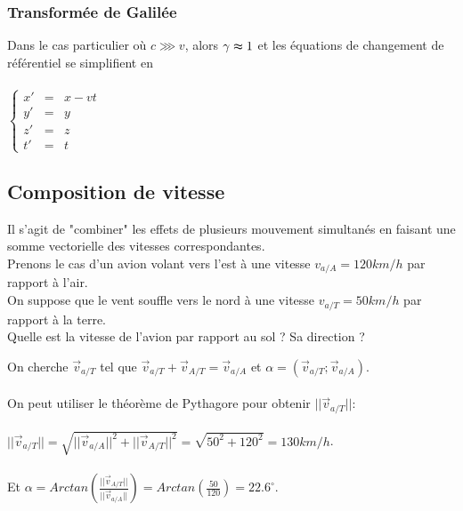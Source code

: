 \documentclass[a4paper,10pt]{book}
\begin{document}
\subsubsection{Transformée de Galilée}
Dans le cas particulier où $c \ggg v$, alors $\gamma \thickapprox 1$ et les équations de changement de référentiel se simplifient en \\\\
$\left \{ \begin{array}{rcl} x'&=&x-vt \\
y'&=&y \\
z'&=&z \\
t'&=&t \end{array} \right .$

\subsection{Composition de vitesse}
Il s’agit de "combiner" les effets de plusieurs mouvement simultanés en faisant une somme vectorielle des vitesses correspondantes.\\

Prenons le cas d'un avion volant vers l'est à une vitesse $v_{a/A}=120km/h$ par rapport à l'air.\\
On suppose que le vent souffle vers le nord à une vitesse $v_{a/T}=50 km/h$ par rapport à la terre.\\
Quelle est la vitesse de l'avion par rapport au sol ? Sa direction ?\\
\begin{center}
\end{center}
On cherche $\vec{v}_{a/T}$ tel que $\vec{v}_{a/T}+\vec{v}_{A/T}=\vec{v}_{a/A}$ et $\alpha=(\vec{v}_{a/T};\vec{v}_{a/A})$.\\\\
On peut utiliser le théorème de Pythagore pour obtenir $||\vec{v}_{a/T}||$:\\\\
$||\vec{v}_{a/T}||=\sqrt{||\vec{v}_{a/A}||^{2}+||\vec{v}_{A/T}||^{2}}=\sqrt{50^{2}+120^{2}}=130km/h$.\\\\
Et $\alpha=Arctan(\frac{||\vec{v}_{A/T}||}{||\vec{v}_{a/A}||})=Arctan(\frac{50}{120})=22.6^{\circ}$.\\
\end{document}
